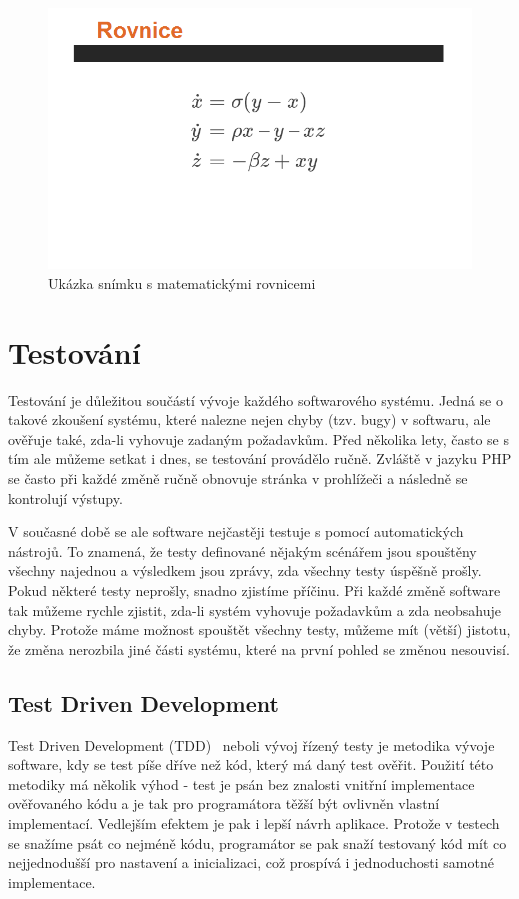 \documentclass[11pt,twoside,a4paper]{book}
\newcommand*{\nomExpl}[2]{#2 (#1)\nomenclature{#1}{#2}} 	%
\begin{document}
\begin{figure}[ht]
	\begin{center}
		\includegraphics[width=14cm]{PRO-img/rovnice.png}
		\caption{Ukázka snímku s matematickými rovnicemi}
		\label{fig:rovnice}
	\end{center}
\end{figure}



\chapter{Testování}
Testování je důležitou součástí vývoje každého softwarového systému. Jedná se o takové zkoušení systému, které nalezne nejen chyby (tzv. bugy) v softwaru, ale ověřuje také, zda-li vyhovuje zadaným požadavkům. Před několika lety, často se s tím ale můžeme setkat i dnes, se testování provádělo ručně. Zvláště v jazyku PHP se často při každé změně ručně obnovuje stránka v prohlížeči a následně se kontrolují výstupy.

V současné době se ale software nejčastěji testuje s pomocí automatických nástrojů. To znamená, že testy definované nějakým scénářem jsou spouštěny všechny najednou a výsledkem jsou zprávy, zda všechny testy úspěšně prošly. Pokud některé testy neprošly, snadno zjistíme příčinu. Při každé změně software tak můžeme rychle zjistit, zda-li systém vyhovuje požadavkům a zda neobsahuje chyby. Protože máme možnost spouštět všechny testy, můžeme mít (větší) jistotu, že změna nerozbila jiné části systému, které na první pohled se změnou nesouvisí.


\section{Test Driven Development}
\nomExpl{TDD}{Test Driven Development}~\cite{tdd} neboli vývoj řízený testy je metodika vývoje software, kdy se test píše dříve než kód, který má daný test ověřit. Použití této metodiky má několik výhod - test je psán bez znalosti vnitřní implementace ověřovaného kódu a je tak pro programátora těžší být ovlivněn vlastní implementací. Vedlejším efektem je pak i lepší návrh aplikace. Protože v testech se snažíme psát co nejméně kódu, programátor se pak snaží testovaný kód mít co nejjednodušší pro nastavení a inicializaci, což prospívá i jednoduchosti samotné implementace.
\end{document}
